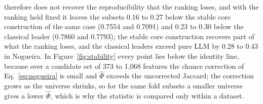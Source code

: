 \documentclass[final,5p,twocolumn]{elsarticle}
\begin{document}
therefore does not recover the reproducibility that the ranking loses, and with the ranking held fixed it leaves the subsets 0.16 to 0.27 below the stable core construction of the same case (0.7554 and 0.7091) and 0.23 to 0.30 below the classical leader (0.7860 and 0.7793); the stable core construction recovers part of what the ranking loses, and the classical leaders exceed pure LLM by 0.28 to 0.43 in Nogueira. In Figure~\ref{fig:stability} every point lies below the identity line, because over a candidate set of 373 to 1,068 features the chance correction of Eq.~\eqref{eq:nogueira} is small and $\hat\Phi$ exceeds the uncorrected Jaccard; the correction grows as the universe shrinks, so for the same fold subsets a smaller universe gives a lower $\hat\Phi$, which is why the statistic is compared only within a dataset.
\end{document}
